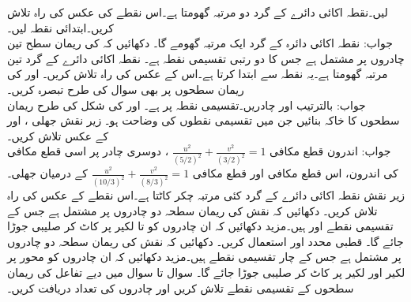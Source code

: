\quad
{} لیں۔نقطہ  اکائی دائرے کے گرد دو مرتبہ گھومتا ہے۔اس نقطے کی عکس کی راہ تلاش کریں۔ابتدائی نقطہ  لیں۔\\
جواب:\quad
نقطہ  اکائی دائرہ  کے گرد ایک مرتبہ گھومے گا۔
\quad
دکھائیں کہ  کی ریمان سطح تین چادروں پر مشتمل ہے جس کا دو رتبی تقسیمی نقطہ  ہے۔ نقطہ  اکائی دائرے کے گرد تین مرتبہ گھومتا ہے۔یہ نقطہ  سے ابتدا کرتا ہے۔اس کے عکس کی راہ تلاش کریں۔
\quad
{} اور  کی ریمان سطحوں  پر بھی سوال  کی طرح تبصرہ کریں۔\\
جواب:\quad
بالترتیب  اور  چادریں۔تقسیمی نقطہ  پر ہے۔
\quad
{} اور  کی شکل  کی طرح  ریمان سطحوں کا خاکہ بنائیں جن میں تقسیمی نقطوں کی وضاحت ہو۔
\quad
زیر نقش  جھلی ،  اور  کے عکس تلاش کریں۔\\
جواب:\quad
اندرون قطع مکافی 
$\tfrac{u^2}{(5/2)^2}+\tfrac{v^2}{(3/2)^2}=1$
، دوسری چادر پر اسی قطع مکافی کی اندرون، اس قطع مکافی اور قطع مکافی 
$\tfrac{u^2}{(10/3)^2}+\tfrac{v^2}{(8/3)^2}=1$
کے درمیان جھلی۔
\quad
زیر نقش  نقطہ  اکائی دائرے کے گرد کئی مرتبہ چکر کاٹتا ہے۔اس نقطے کے عکس کی راہ تلاش کریں۔
\quad
دکھائیں کہ نقش   کی ریمان سطحہ دو چادروں پر مشتمل ہے  جس  کے تقسیمی نقطے  اور  ہیں۔مزید دکھائیں کہ ان چادروں کو  تا  لکیر پر کاٹ کر صلیبی جوڑا جائے گا۔ قطبی محدد  اور  استعمال کریں۔
\quad
دکھائیں کہ نقش   کی ریمان سطحہ دو چادروں پر مشتمل ہے  جس  کے چار تقسیمی نقطے ہیں۔مزید دکھائیں کہ ان چادروں کو  محور پر لکیر     اور لکیر  پر کاٹ کر صلیبی جوڑا جائے گا۔
سوال  تا سوال  میں دیے تفاعل کی ریمان سطحوں  کے تقسیمی نقطے تلاش کریں اور چادروں کی تعداد دریافت کریں۔ 

